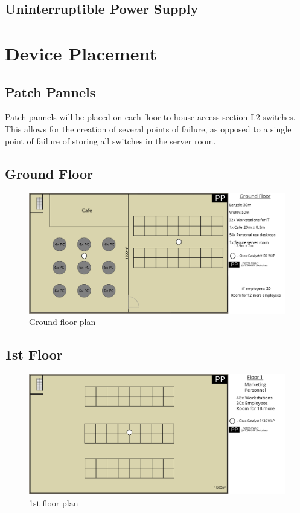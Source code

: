 \subsection{Uninterruptible Power Supply}

\section{Device Placement}
\subsection{Patch Pannels}
Patch pannels will be placed on each floor to house access section L2 switches. This allows for the creation of several points of failure, as opposed to a single point of failure of storing all switches in the server room.
\subsection{Ground Floor}
\begin{figure}[H]
    \includegraphics[width=15cm]{Figures/ground.png}
    \caption{Ground floor plan}
    \label{fig:ground_floor}
\end{figure}
\subsection{1st Floor}
\begin{figure}[H]
    \includegraphics[width=15cm]{Figures/1st-floor.png}
    \caption{1st floor plan}
    \label{fig:1st_floor}
\end{figure}
